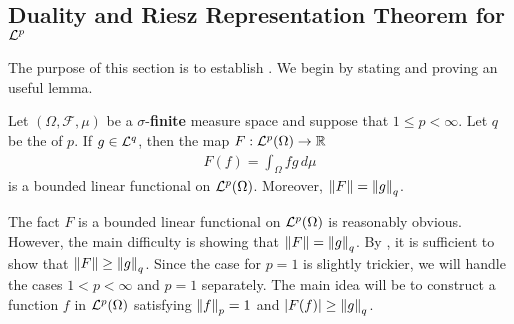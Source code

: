 \subsection{Duality and Riesz Representation Theorem for ${\mathcal {L}^p}$}

The purpose of this section is to establish .
We begin by stating and proving an useful lemma.

\begin{lemma}
\label{lemma:lp:funct_norm}
Let $(\Omega, \mathcal{F}, \mu)$ be a $\sigma$-\textbf{finite} measure space and suppose that $1 \leq p < \infty$. 
Let $q$ be the  of $p$. If $g \in {\mathcal {L}^q}$, then the map $F : {\mathcal {L}^p}(\Omega) \to {\mathbb R}$
\begin{align*}
    F(f) = \int_\Omega fg \,d\mu
\end{align*}
is a bounded linear functional on ${\mathcal {L}^p}(\Omega)$. Moreover, $\left\lVert F\right\rVert = \left\lVert g\right\rVert_q$.
\end{lemma}
\begin{proof-idea*}
The fact $F$ is a bounded linear functional on ${\mathcal {L}^p}(\Omega)$ is reasonably obvious. However, the main difficulty is showing that $\left\lVert F\right\rVert = \left\lVert g\right\rVert_q$. By , it is sufficient to show that $\left\lVert F\right\rVert \geq \left\lVert g\right\rVert_q$. Since the case for $p=1$ is slightly trickier, we will handle the cases $1 < p < \infty$ and $p = 1$ separately. The main idea will be to construct a function $f$ in ${\mathcal {L}^p}(\Omega)$ satisfying $\left\lVert f\right\rVert_p = 1$ and $|F(f)| \geq \left\lVert g\right\rVert_q$.
\end{proof-idea*}
